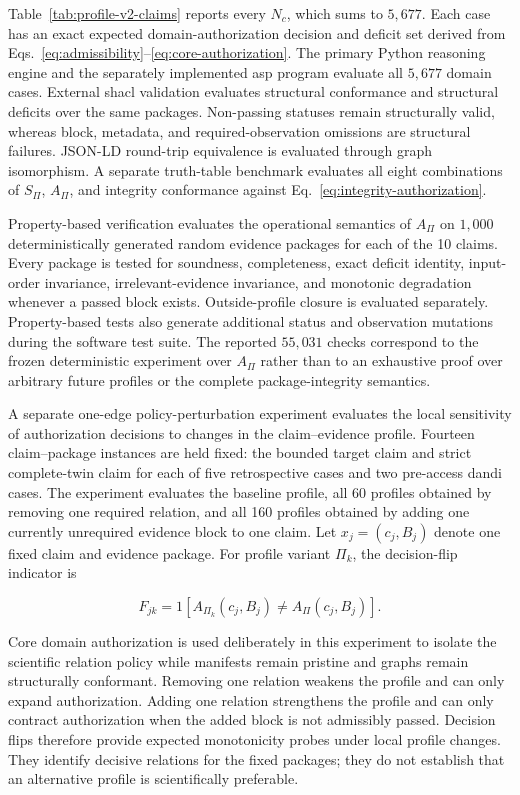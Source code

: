 \documentclass[11pt,a4paper]{article}
\begin{document}
Table~\ref{tab:profile-v2-claims} reports every $N_c$, which sums to $5,677$. Each case has an exact expected domain-authorization decision and deficit set derived from Eqs.~\ref{eq:admissibility}--\ref{eq:core-authorization}. The primary Python reasoning engine and the separately implemented \ac{asp} program evaluate all $5,677$ domain cases. External \ac{shacl} validation evaluates structural conformance and structural deficits over the same packages. Non-passing statuses remain structurally valid, whereas block, metadata, and required-observation omissions are structural failures. JSON-LD round-trip equivalence is evaluated through graph isomorphism. A separate truth-table benchmark evaluates all eight combinations of $S_{\Pi}$, $A_{\Pi}$, and integrity conformance against Eq.~\ref{eq:integrity-authorization}.

Property-based verification evaluates the operational semantics of $A_{\Pi}$ on $1,000$ deterministically generated random evidence packages for each of the 10 claims. Every package is tested for soundness, completeness, exact deficit identity, input-order invariance, irrelevant-evidence invariance, and monotonic degradation whenever a passed block exists. Outside-profile closure is evaluated separately. Property-based tests also generate additional status and observation mutations during the software test suite. The reported $55,031$ checks correspond to the frozen deterministic experiment over $A_{\Pi}$ rather than to an exhaustive proof over arbitrary future profiles or the complete package-integrity semantics.

A separate one-edge policy-perturbation experiment evaluates the local sensitivity of authorization decisions to changes in the claim--evidence profile. Fourteen claim--package instances are held fixed: the bounded target claim and strict complete-twin claim for each of five retrospective cases and two pre-access \ac{dandi} cases. The experiment evaluates the baseline profile, all 60 profiles obtained by removing one required relation, and all 160 profiles obtained by adding one currently unrequired evidence block to one claim. Let $x_j=(c_j,B_j)$ denote one fixed claim and evidence package. For profile variant $\Pi_k$, the decision-flip indicator is

\begin{equation}
F_{jk}=\mathrm{1}\!\left[
A_{\Pi_k}(c_j,B_j)\neq A_{\Pi}(c_j,B_j)
\right].
\label{eq:profile-sensitivity-flip}
\end{equation}

Core domain authorization is used deliberately in this experiment to isolate the scientific relation policy while manifests remain pristine and graphs remain structurally conformant. Removing one relation weakens the profile and can only expand authorization. Adding one relation strengthens the profile and can only contract authorization when the added block is not admissibly passed. Decision flips therefore provide expected monotonicity probes under local profile changes. They identify decisive relations for the fixed packages; they do not establish that an alternative profile is scientifically preferable.
\end{document}

